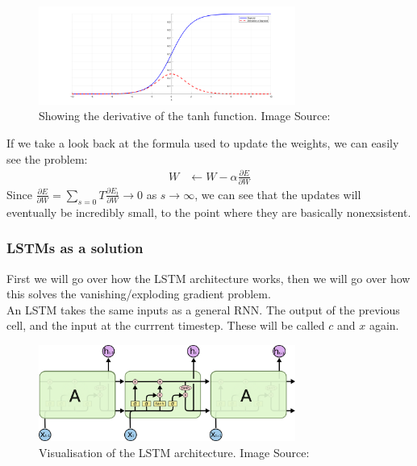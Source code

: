 \begin{figure}[ht]
    \centering
        \includegraphics[width=0.75\textwidth]{latex/imgs/tanh_deriv.png}
    \caption{Showing the derivative of the tanh function. Image Source:\cite{grad}}
\end{figure}
If we take a look back at the formula used to update the weights, we can easily see the problem:
\begin{align}
    W &\leftarrow W - \alpha \frac{\partial E}{\partial W}
\end{align}
Since $\frac{\partial E}{\partial W} = \sum_{s=0}{T} \frac{\partial E_t}{\partial W} \rightarrow 0$ as $s \rightarrow \infty$, we can see that the updates will eventually be incredibly small, to the point where they are basically nonexsistent.

\subsubsection{LSTMs as a solution}
First we will go over how the LSTM architecture works, then we will go over how this solves the vanishing/exploding gradient problem.\\

\noindent
An LSTM takes the same inputs as a general RNN. The output of the previous cell, and the input at the currrent timestep. These will be called $c$ and $x$ again.\\
\begin{figure}[ht]
    \centering
        \includegraphics[width=0.75\textwidth]{latex/imgs/lstm.png}
    \caption{Visualisation of the LSTM architecture. Image Source:\cite{grad}}
\end{figure}
